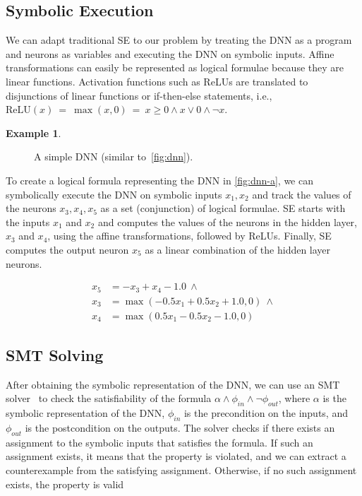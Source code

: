 \documentclass[oneside,11pt,dvipsnames]{book}
\numberwithin{equation}{section}
\theoremstyle{definition}
\newtheorem{example}{Example}[section]
\theoremstyle{remark}
\newcommand{\relu}[1]{\mathrm{ReLU}\left(#1\right)}
\begin{document}
\subsection{Symbolic Execution}\label{sec:se}
We can adapt traditional SE to our problem by treating the DNN as a program and neurons as variables and executing the DNN on symbolic inputs. Affine transformations can easily be represented as logical formulae because they are linear functions. Activation functions such as ReLUs are translated to disjunctions of linear functions or if-then-else statements, i.e., $\relu{x} ~=~ \max(x,0) ~=~ x \ge 0 \land x \lor 0 \land \neg x$.


\begin{example}\label{ex:se-dnn}
\begin{figure}
\centering
\mydnn
\caption{\label{fig:dnn-a}A simple DNN (similar to~\autoref{fig:dnn}).}
\end{figure}    

To create a logical formula representing the DNN in \autoref{fig:dnn-a}, we can symbolically execute the DNN on symbolic inputs $x_1,x_2$ and track the values of the neurons $x_3, x_4, x_5$ as a set (conjunction) of logical formulae.  SE starts with the inputs $x_1$ and $x_2$ and computes the values of the neurons in the hidden layer, $x_3$ and $x_4$, using the affine transformations, followed by ReLUs. Finally, SE computes the output neuron $x_5$ as a linear combination of the hidden layer neurons.

\begin{equation}\label{eq:se-dnn}
    \begin{split}
x_5 &= -x_3 + x_4 - 1.0 ~\land \\
x_3 &= \max(-0.5x_1 + 0.5x_2 + 1.0, 0) ~\land \\
x_4 &= \max(0.5x_1 - 0.5x_2 - 1.0, 0)
    \end{split}
\end{equation}

\end{example}

\subsection{SMT Solving}\label{sec:smt}
After obtaining the symbolic representation of the DNN, we can use an SMT solver~\cite{barrett2010smt} to check the satisfiability of the formula $\alpha \land \phi_{in} \land \neg \phi_{out} $, where $\alpha$ is the symbolic representation of the DNN, $\phi_{in}$ is the precondition on the inputs, and $\phi_{out}$ is the postcondition on the outputs. The solver checks if there exists an assignment to the symbolic inputs that satisfies the formula. If such an assignment exists, it means that the property is violated, and we can extract a counterexample from the satisfying assignment. Otherwise, if no such assignment exists, the property is valid
\end{document}
